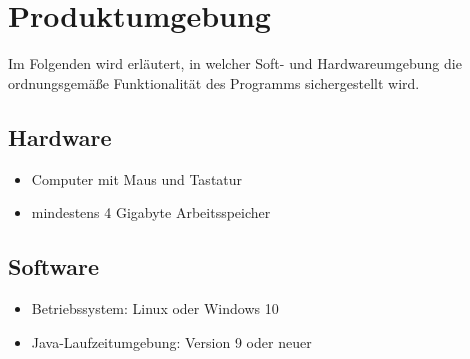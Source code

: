 \section{Produktumgebung}

Im Folgenden wird erläutert, in welcher Soft- und Hardwareumgebung die ordnungsgemäße Funktionalität des Programms sichergestellt wird.

\subsection{Hardware}
\begin{itemize}
\item Computer mit Maus und Tastatur
\item mindestens 4 Gigabyte Arbeitsspeicher
\end{itemize}

\subsection{Software}
\begin{itemize}
\item Betriebssystem: Linux oder Windows 10
\item Java-Laufzeitumgebung: Version 9 oder neuer
\end{itemize}